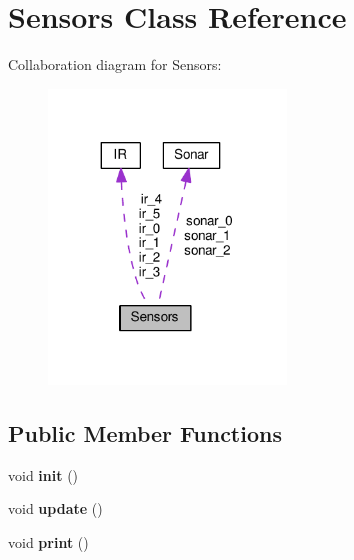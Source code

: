 \hypertarget{class_sensors}{}\section{Sensors Class Reference}
\label{class_sensors}


Collaboration diagram for Sensors\+:
\nopagebreak
\begin{figure}[H]
\begin{center}
\leavevmode
\includegraphics[width=179pt]{class_sensors__coll__graph}
\end{center}
\end{figure}
\subsection*{Public Member Functions}
\begin{DoxyCompactItemize}
\item 
void {\bfseries init} ()\hypertarget{class_sensors_a6dc9f66e4319c82649dc79cfa4e5ead8}{}\label{class_sensors_a6dc9f66e4319c82649dc79cfa4e5ead8}

\item 
void {\bfseries update} ()\hypertarget{class_sensors_af0290d09b1ae4dd7726a2a6613bf354b}{}\label{class_sensors_af0290d09b1ae4dd7726a2a6613bf354b}

\item 
void {\bfseries print} ()\hypertarget{class_sensors_ad38384b568dac4c2f656a78c28464e9a}{}\label{class_sensors_ad38384b568dac4c2f656a78c28464e9a}

\end{DoxyCompactItemize}
